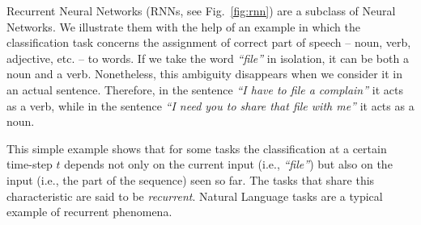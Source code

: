 Recurrent Neural Networks (RNNs, see Fig.~\ref{fig:rnn}) are a subclass of Neural Networks. We
illustrate them with the help of an example in which the
classification task concerns the assignment of correct part of speech -- noun, verb, adjective, etc. --
to words.  If we take the word \emph{``file''} in isolation,
it can be both a noun and a verb. Nonetheless, this ambiguity
disappears when we consider it in an actual sentence. Therefore, in the
sentence \emph{``I have to file a complain''} it acts as a verb, while
in the sentence \emph{``I need you to share that file with me''} it
acts as a noun.

This simple example shows that for some tasks the classification at a
certain time-step $t$ depends not only on the current input (i.e.,
\emph{``file''}) but also on the input (i.e., the part of the
sequence) seen so far. The tasks that share this characteristic are
said to be \emph{recurrent}. Natural Language tasks are a typical
example of recurrent phenomena.

